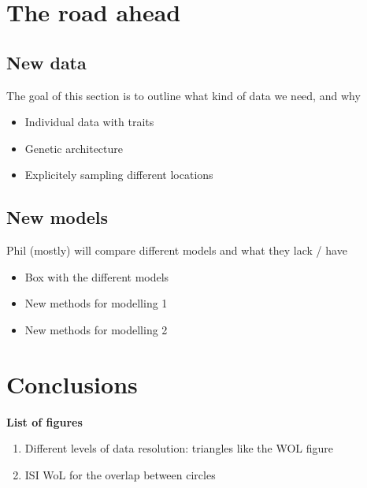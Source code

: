 \documentclass[11pt,oneside]{article}
\begin{document}

\section{The road ahead}

\subsection{New data}

The goal of this section is to outline what kind of data we need, and why

\begin{itemize}
	\item Individual data with traits
	\item Genetic architecture
	\item Explicitely sampling different locations
\end{itemize}

\subsection{New models}

Phil (mostly) will compare different models and what they lack / have 

\begin{itemize}
	\item Box with the different models
	\item New methods for modelling 1
	\item New methods for modelling 2
\end{itemize}


\section{Conclusions}

\printbibliography

\cleardoublepage

\textbf{List of figures}
\begin{enumerate}
	\item Different levels of data resolution: triangles like the WOL figure
	\item ISI WoL for the overlap between circles
\end{enumerate}
\end{document}
